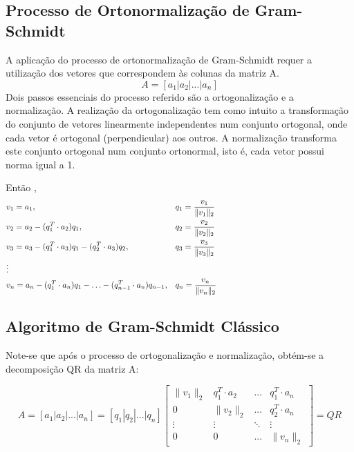 \documentclass[]{article}
\numberwithin{equation}{subsection}
\begin{document}
\subsection{Processo de Ortonormalização de Gram-Schmidt}

A aplicação do processo de ortonormalização de Gram-Schmidt requer a
utilização dos vetores que correspondem às colunas da matriz A.
\begin{equation}
A=[a_1|a_2|...|a_n]
\end{equation} Dois passos essenciais do processo referido são a
ortogonalização e a normalização. A realização da ortogonalização tem
como intuito a transformação do conjunto de vetores linearmente
independentes num conjunto ortogonal, onde cada vetor é ortogonal
(perpendicular) aos outros. A normalização transforma este conjunto
ortogonal num conjunto ortonormal, isto é, cada vetor possui norma igual
a 1.

Então \cite{IY07}, \begin{multline}
\begin{aligned}
& v_1 = a_1, && q_1 = \frac{v_1}{\|v_1\|_2} \\
& v_2 = a_2 - (q_1^T \cdot a_2) q_1, && q_2 = \frac{v_2}{\|v_2\|_2} \\
& v_3 = a_3 - (q_1^T \cdot a_3) q_1 - (q_2^T \cdot a_3) q_2, && q_3 = \frac{v_3}{\|v_3\|_2} \\
& \vdots && \hspace{7.65cm} \\
& v_n = a_n - (q_1^T \cdot a_n) q_1 - \ldots - (q_{n-1}^T \cdot a_n) q_{n-1}, && q_n = \frac{v_n}{\|v_n\|_2}
\end{aligned}
\end{multline}

\subsection{Algoritmo de Gram-Schmidt Clássico}

Note-se que após o processo de ortogonalização e normalização, obtém-se
a decomposição QR da matriz A:

\begin{equation}
A = [a_1| a_2|...| a_n] = [q_1| q_2|...| q_n]
\begin{bmatrix}
\|v_1\|_2 & q_1^T\cdot a_2 &...& q_1^T\cdot a_n \\
0 & \|v_2\|_2 &...& q_2^T\cdot a_n \\
\vdots & \vdots & \ddots &\vdots \\
0 & 0 &...& \|v_n\|_2 
\end{bmatrix}
= QR
\end{equation}
\end{document}
